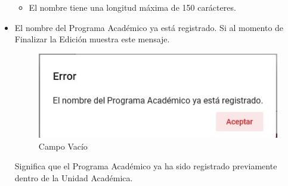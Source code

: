 \begin{itemize}
\begin{itemize}
                        \item El nombre tiene una longitud máxima de 150 carácteres.
                    \end{itemize}

                \item El nombre del Programa Académico ya está registrado.
                    Si al momento de Finalizar la Edición muestra este mensaje.

                     \begin{figure}[!hbtp]
                    \centering
                    \hypertarget{vacio}{\includegraphics[width=0.7\linewidth]{images/SP3/Yareg}}
                    \caption{Campo Vacío}
                    \label{vacio}
                    \end{figure}

                    Significa que el Programa Académico ya ha sido registrado previamente dentro de la Unidad Académica.
            \end{itemize}
